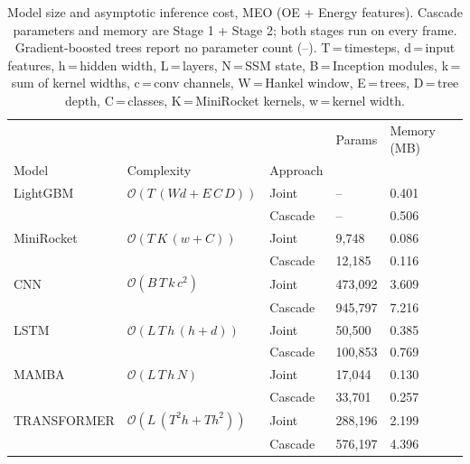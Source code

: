 \begin{table}
\centering
\caption{Model size and asymptotic inference cost, MEO (OE + Energy features). Cascade parameters and memory are Stage 1 + Stage 2; both stages run on every frame. Gradient-boosted trees report no parameter count (--). T\,=\,timesteps, d\,=\,input features, h\,=\,hidden width, L\,=\,layers, N\,=\,SSM state, B\,=\,Inception modules, k\,=\,sum of kernel widths, c\,=\,conv channels, W\,=\,Hankel window, E\,=\,trees, D\,=\,tree depth, C\,=\,classes, K\,=\,MiniRocket kernels, w\,=\,kernel width.}
\label{tab:complexity_meo}
\begin{tabular}{lllll}
\toprule
            &                                   &         &     Params & Memory (MB) \\
Model & Complexity & Approach &            &             \\
\midrule
LightGBM & $\mathcal{O}(T\,(W d + E\,C\,D))$ & Joint &         -- &       0.401 \\
            &                                   & Cascade &         -- &       0.506 \\
MiniRocket & $\mathcal{O}(T\,K\,(w + C))$ & Joint &    9{,}748 &       0.086 \\
            &                                   & Cascade &   12{,}185 &       0.116 \\
CNN & $\mathcal{O}(B\,T\,k\,c^2)$ & Joint &  473{,}092 &       3.609 \\
            &                                   & Cascade &  945{,}797 &       7.216 \\
LSTM & $\mathcal{O}(L\,T\,h\,(h+d))$ & Joint &   50{,}500 &       0.385 \\
            &                                   & Cascade &  100{,}853 &       0.769 \\
MAMBA & $\mathcal{O}(L\,T\,h\,N)$ & Joint &   17{,}044 &       0.130 \\
            &                                   & Cascade &   33{,}701 &       0.257 \\
TRANSFORMER & $\mathcal{O}(L\,(T^2 h + T h^2))$ & Joint &  288{,}196 &       2.199 \\
            &                                   & Cascade &  576{,}197 &       4.396 \\
\bottomrule
\end{tabular}
\end{table}
